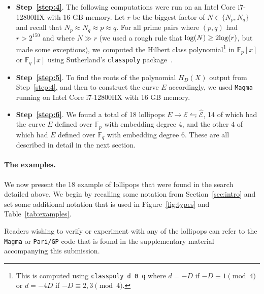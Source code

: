 \documentclass[version=preprint]{iacrcc}
\newif\iffullversion
\newcommand{\F}{\mathbb{F}}
\newcommand{\EC}{\mathcal{E}}
\begin{document}
\begin{itemize}
\begin{enumerate}[label=(\roman*)]
\item Of the 4,281 pairs of primes $(p,q)$ corresponding to~\eqref{CMp}, 350 candidates had both $p$ and $q$ at least 298 bits long.\footnote{We wanted a minimum of 80 bits of security, so chose the original {\sf MNT298} size from~\cite{scalable} as the lower bound on the sizes of $p$ and $q$.} Of these, we were able to successfully factor 186 of them. 
\item Of the 3,912 pairs of primes $(p,q)$ corresponding to~\eqref{CMq}, 337 candidates had both $p$ and $q$ at least 298 bits long. Of these, we were able to successfully factor 203 of them.
\end{enumerate}
\item {\bf Step~\ref{step:4}}. The following computations were run on an Intel Core i7-12800HX with 16 GB memory. Let $r$ be the biggest factor of $N \in \{N_p, N_q\}$ and recall that $N_p \approx N_q \approx p \approx q$. For all prime pairs where $(p,q)$ had $r > 2^{150}$ and where $N \gg r$ (we used a rough rule that ${\rm log}(N) \geq 2 {\rm log}(r)$, but made some exceptions), we computed the Hilbert class polynomial\footnote{This is computed using \texttt{classpoly d 0 q} where $d=-D$ if $-D\equiv 1\pmod 4$ or $d=-4D$ if $-D\equiv 2,3\pmod 4$.} in $\F_p[x]$ or $\F_q[x]$ using Sutherland's \texttt{classpoly} package~\cite{Sutherland11a,EngeSutherland}. 
\item {\bf Step~\ref{step:5}}. To find the roots of the polynomial $H_D(X)$ output from Step~\ref{step:4}, and then to construct the curve $E$ accordingly, we used \texttt{Magma}~\cite{Magma} running on Intel Core i7-12800HX with 16 GB memory. 
\item {\bf Step~\ref{step:6}}. We found a total of 18 lollipops $E \rightarrow \EC \leftrightharpoons \hat{\EC}$, 14 of which had the curve $E$ defined over $\F_p$ with embedding degree 4, and the other 4 of which had $E$ defined over $\F_q$ with embedding degree 6. These are all described in detail in the next section. 
\end{itemize}


\paragraph{The examples.} We now present the 18 example of lollipops that were found in the search detailed above. We begin by recalling some notation from Section~\ref{sec:intro} and set some additional notation that is used in Figure~\ref{fig:types} and Table~\ref{tab:examples}. 
\iffullversion
The full list of detailed examples can be found in Appendix~\ref{sec:appendix}. Readers wishing to verify or experiment with any of the lollipops can refer to the \texttt{Magma} or \texttt{Pari/GP} code that is found at 
\begin{center}
\url{https://github.com/craigcostello/pairing-friendly-lollipops}.
\end{center}
\else
Readers wishing to verify or experiment with any of the lollipops can refer to the \texttt{Magma} or \texttt{Pari/GP} code that is found in the supplementary material accompanying this submission. 
\fi
\end{document}
